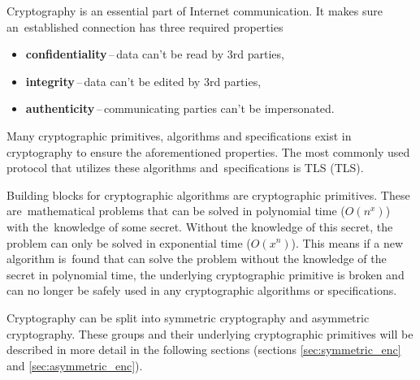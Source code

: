 Cryptography is an essential part of Internet communication. It makes sure an~established connection has three required properties \cite{Bernstein149}
\begin{itemize}
  \item \textbf{confidentiality}\,--\,data can't be read by 3rd parties,
  \item \textbf{integrity}\,--\,data can't be edited by 3rd parties,
  \item \textbf{authenticity}\,--\,communicating parties can't be impersonated.
\end{itemize}
Many cryptographic primitives, algorithms and specifications exist in cryptography to ensure the aforementioned properties. The most commonly used protocol that utilizes these algorithms and~specifications is TLS (\acl{TLS}).

Building blocks for cryptographic algorithms are cryptographic primitives. These are~mathematical problems that can be solved in polynomial time ($O(n^x)$) with the~knowledge of some secret. Without the knowledge of this secret, the problem can only be solved in exponential time ($O(x^n)$). This means if a new algorithm is~found that can solve the problem without the knowledge of the secret in polynomial time, the underlying cryptographic primitive is broken and can no longer be safely used in any cryptographic algorithms or specifications.\cite{Smart2004}

Cryptography can be split into symmetric cryptography and asymmetric cryptography. These groups and their underlying cryptographic primitives will be described in more detail in the following sections (sections \ref{sec:symmetric_enc} and \ref{sec:asymmetric_enc}).
